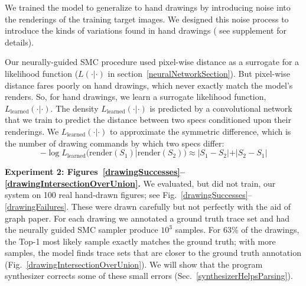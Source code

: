 \documentclass{article}
\theoremstyle{definition}
\begin{document}
 We trained the model
to generalize to hand drawings by introducing noise into the
renderings of the training target images.
We designed this noise process to introduce the kinds of variations found in hand drawings (%
see supplement for details).

Our neurally-guided SMC procedure
used pixel-wise distance as a surrogate for a likelihood function ($L(\cdot|\cdot)$ in section~\ref{neuralNetworkSection}).
But pixel-wise distance fares poorly on hand drawings, which never exactly match
the model's renders.
So, for hand drawings,
we learn a surrogate likelihood function,
$L_{\text{learned}}(\cdot|\cdot)$.
The density $L_{\text{learned}}(\cdot|\cdot)$ is predicted by a convolutional network that we train to predict
the distance between two specs conditioned upon their renderings.
We $L_{\text{learned}}(\cdot |\cdot )$  to approximate the symmetric difference,
which is  the number of drawing commands by which two specs  differ:
  \begin{equation}
    -\log L_{\text{learned}}(\text{render}(S_1)|\text{render}(S_2))\approx |S_1 - S_2| + |S_2 - S_1|\label{symmetricDistance}
    \end{equation}




  \textbf{Experiment 2: Figures~\ref{drawingSuccesses}--\ref{drawingIntersectionOverUnion}.}
    We evaluated, but did not train, our system on 100 real hand-drawn figures; see Fig.~\ref{drawingSuccesses}--\ref{drawingFailures}.
These were drawn carefully but not perfectly with the aid of graph paper.
For each drawing we annotated a ground truth trace set and had the neurally guided SMC sampler
produce $10^3$ samples. %
For 63\% of the drawings, the Top-1 most likely sample exactly matches the
ground truth; with more samples, the model finds trace sets
that are closer to the ground truth annotation (Fig.~\ref{drawingIntersectionOverUnion}).
We will show that the program synthesizer
corrects some of these small errors (Sec.~\ref{synthesizerHelpsParsing}).
\end{document}
